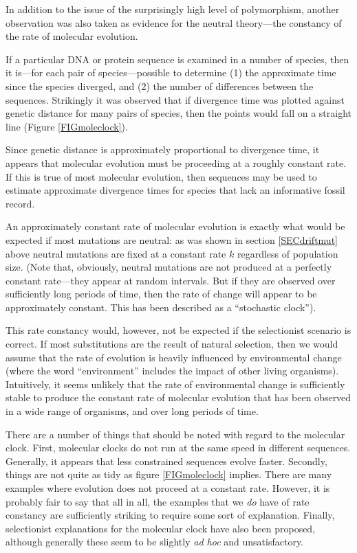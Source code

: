 \documentclass[11pt,a4paper]{book}
\newcommand{\e}{\emph}
\begin{document}
In addition to the issue of the surprisingly high level of polymorphism, another observation was also taken as evidence for the neutral theory---the constancy of the rate of molecular evolution. 

If a particular DNA or protein sequence is examined in a number of species, then it is---for each pair of species---possible to determine (1) the approximate time since the species diverged, and (2) the number of differences between the sequences. Strikingly it was observed that if divergence time was plotted against genetic  distance for many pairs of species, then the points would fall on a straight line (Figure \ref{FIGmoleclock}).

Since genetic distance is approximately proportional to divergence time, it appears that molecular evolution must be proceeding at a roughly constant rate. If this is true of most molecular evolution, then sequences may be used to estimate approximate divergence times for species that lack an informative fossil record. 

An approximately  constant rate of molecular evolution is exactly what would be expected if most mutations are neutral: as was shown in section \ref{SECdriftmut} above neutral mutations are fixed at a constant rate $k$ regardless of population size. (Note that, obviously, neutral mutations are not produced at a perfectly constant rate---they appear at random intervals. But if they are observed over sufficiently long periods of time, then the rate of change will appear to be approximately constant. This has been described as a ``stochastic clock''). 

This rate constancy would, however,  not be expected if the selectionist scenario is correct. If most substitutions are the result of natural selection, then we would assume that the rate of evolution is heavily influenced by environmental change (where the word ``environment'' includes the impact of other living organisms). Intuitively, it  seems unlikely that the rate of environmental change is sufficiently stable to produce the constant rate of molecular evolution that has been observed in a wide range of organisms, and over long periods of time. 

There are a number of things that should be noted with regard to the molecular clock. First, molecular clocks do not run at the same speed in different sequences. Generally, it appears that less constrained sequences evolve faster. Secondly, things are not quite as tidy as figure \ref{FIGmoleclock} implies. There are many examples where evolution does not proceed at a constant rate. However, it is probably fair to say that all in all, the examples that we \e{do} have of rate constancy are sufficiently striking to require some sort of explanation. Finally, selectionist explanations for the molecular clock have also been proposed, although generally these seem to be slightly \e{ad hoc} and unsatisfactory.
\end{document}
